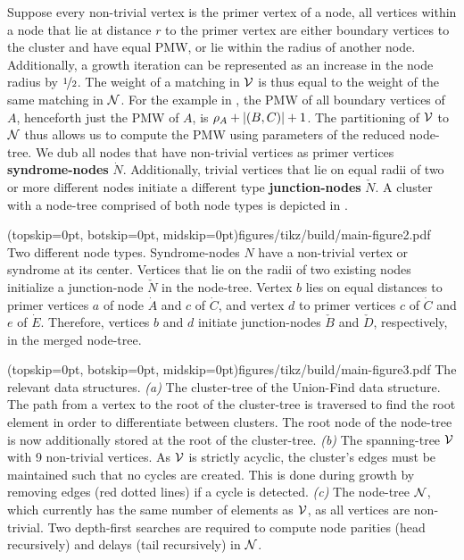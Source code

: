 Suppose every non-trivial vertex is the primer vertex of a node, all vertices within a node that lie at distance $r$ to the primer vertex are either boundary vertices to the cluster and have equal PMW, or lie within the radius of another node. Additionally, a growth iteration can be represented as an increase in the node radius by $\nicefrac{1}{2}$. The weight of a matching in $\mathcal{V}$ is thus equal to the weight of the same matching in $\mathcal{N}$. For the example in , the PMW of all boundary vertices of $A$, henceforth just the PMW of $A$, is $\rho_A + \lvert(B,C)\rvert +1$. The partitioning of $\mathcal{V}$ to $\mathcal{N}$ thus allows us to compute the PMW using parameters of the reduced node-tree. We dub all nodes that have non-trivial vertices as primer vertices \textbf{syndrome-nodes} $\dot{N}$. Additionally, trivial vertices that lie on equal radii of two or more different nodes initiate a different type \textbf{junction-nodes} $\check{N}$. A cluster with a node-tree comprised of both node types is depicted in . 

\Figure[htb](topskip=0pt, botskip=0pt, midskip=0pt){figures/tikz/build/main-figure2.pdf}{
Two different node types. Syndrome-nodes $N$ have a non-trivial vertex or syndrome at its center. Vertices that lie on the radii of two existing nodes initialize a junction-node $\check{N}$ in the node-tree. Vertex $b$ lies on equal distances to primer vertices $a$ of node $\dot{A}$ and $c$ of $\dot{C}$, and vertex $d$ to primer vertices $c$ of $\dot{C}$ and $e$ of $\dot{E}$. Therefore, vertices $b$ and $d$ initiate junction-nodes $\check{B}$ and $\check{D}$, respectively, in the merged node-tree. \label{fig2}}

\Figure[hbt!](topskip=0pt, botskip=0pt, midskip=0pt){figures/tikz/build/main-figure3.pdf}{
    The relevant data structures. \emph{(a)} The cluster-tree of the Union-Find data structure. The path from a vertex to the root of the cluster-tree is traversed to find the root element in order to differentiate between clusters. The root node of the node-tree is now additionally stored at the root of the cluster-tree. \emph{(b)} The spanning-tree $\mathcal{V}$ with 9 non-trivial vertices. As $\mathcal{V}$ is strictly acyclic, the cluster's edges must be maintained such that no cycles are created. This is done during growth by removing edges (red dotted lines) if a cycle is detected. \emph{(c)} The node-tree $\mathcal{N}$, which currently has the same number of elements as $\mathcal{V}$, as all vertices are non-trivial. Two depth-first searches are required to compute node parities (head recursively) and delays (tail recursively) in $\mathcal{N}$.\label{fig3}}

